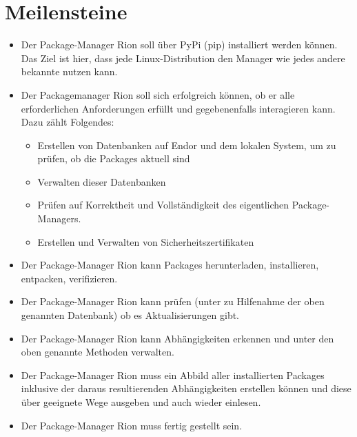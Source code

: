 \section{Meilensteine}

\begin{itemize}
	\item 
		Der Package-Manager Rion soll über PyPi (pip) installiert werden können. Das Ziel ist hier, dass jede Linux-Distribution den Manager wie jedes andere bekannte  nutzen kann.
	
	\item Der Packagemanager Rion soll sich erfolgreich  können, ob er alle erforderlichen Anforderungen erfüllt und gegebenenfalls interagieren kann. Dazu zählt Folgendes:
		
		\begin{itemize}	
			\item Erstellen von Datenbanken auf Endor und dem lokalen System, um zu prüfen, ob die Packages aktuell sind
			\item Verwalten dieser Datenbanken
			\item Prüfen auf Korrektheit und Vollständigkeit des eigentlichen Package-Managers.
			\item Erstellen und Verwalten von Sicherheitszertifikaten
		\end{itemize}
	\item Der Package-Manager Rion kann Packages herunterladen, installieren, entpacken, verifizieren.
	\item Der Package-Manager Rion kann prüfen (unter zu Hilfenahme der oben genannten Datenbank) ob es Aktualisierungen gibt.
	\item Der Package-Manager Rion kann Abhängigkeiten erkennen und unter den oben genannte Methoden verwalten.
	\item Der Package-Manager Rion muss ein Abbild aller installierten Packages inklusive der daraus resultierenden Abhängigkeiten erstellen können und diese über geeignete Wege ausgeben und auch wieder einlesen.
	\item Der Package-Manager Rion muss fertig gestellt sein.
\end{itemize}